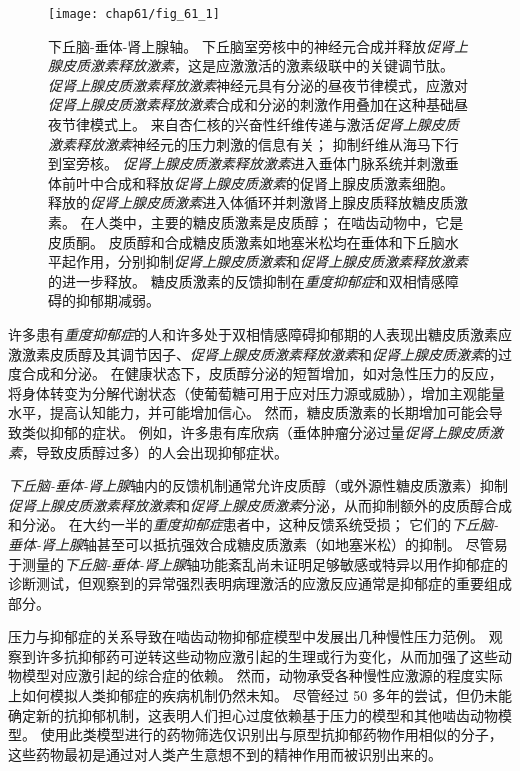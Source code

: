 \begin{figure}[htbp]
	\centering
	\texttt{[image: chap61/fig\_61\_1]}
	\caption{下丘脑-垂体-肾上腺轴。
		下丘脑室旁核中的神经元合成并释放\textit{促肾上腺皮质激素释放激素}，这是应激激活的激素级联中的关键调节肽。
		\textit{促肾上腺皮质激素释放激素}神经元具有分泌的昼夜节律模式，应激对\textit{促肾上腺皮质激素释放激素}合成和分泌的刺激作用叠加在这种基础昼夜节律模式上。
		来自杏仁核的兴奋性纤维传递与激活\textit{促肾上腺皮质激素释放激素}神经元的压力刺激的信息有关；
		抑制纤维从海马下行到室旁核。
		\textit{促肾上腺皮质激素释放激素}进入垂体门脉系统并刺激垂体前叶中合成和释放\textit{促肾上腺皮质激素}的促肾上腺皮质激素细胞。
		释放的\textit{促肾上腺皮质激素}进入体循环并刺激肾上腺皮质释放糖皮质激素。
		在人类中，主要的糖皮质激素是皮质醇；
		在啮齿动物中，它是皮质酮。
		皮质醇和合成糖皮质激素如地塞米松均在垂体和下丘脑水平起作用，分别抑制\textit{促肾上腺皮质激素}和\textit{促肾上腺皮质激素释放激素}的进一步释放。
		糖皮质激素的反馈抑制在\textit{重度抑郁症}和双相情感障碍的抑郁期减弱\cite{nestler2020nestler}。}
	\label{fig:61_1}
\end{figure}


许多患有\textit{重度抑郁症}的人和许多处于双相情感障碍抑郁期的人表现出糖皮质激素应激激素皮质醇及其调节因子、\textit{促肾上腺皮质激素释放激素}和\textit{促肾上腺皮质激素}的过度合成和分泌。
在健康状态下，皮质醇分泌的短暂增加，如对急性压力的反应，将身体转变为分解代谢状态（使葡萄糖可用于应对压力源或威胁），增加主观能量水平，提高认知能力，并可能增加信心。
然而，糖皮质激素的长期增加可能会导致类似抑郁的症状。
例如，许多患有库欣病（垂体肿瘤分泌过量\textit{促肾上腺皮质激素}，导致皮质醇过多）的人会出现抑郁症状。


\textit{下丘脑-垂体-肾上腺}轴内的反馈机制通常允许皮质醇（或外源性糖皮质激素）抑制\textit{促肾上腺皮质激素释放激素}和\textit{促肾上腺皮质激素}分泌，从而抑制额外的皮质醇合成和分泌。
在大约一半的\textit{重度抑郁症}患者中，这种反馈系统受损；
它们的\textit{下丘脑-垂体-肾上腺}轴甚至可以抵抗强效合成糖皮质激素（如地塞米松）的抑制。
尽管易于测量的\textit{下丘脑-垂体-肾上腺}轴功能紊乱尚未证明足够敏感或特异以用作抑郁症的诊断测试，但观察到的异常强烈表明病理激活的应激反应通常是抑郁症的重要组成部分。


压力与抑郁症的关系导致在啮齿动物抑郁症模型中发展出几种慢性压力范例。
观察到许多抗抑郁药可逆转这些动物应激引起的生理或行为变化，从而加强了这些动物模型对应激引起的综合症的依赖。
然而，动物承受各种慢性应激源的程度实际上如何模拟人类抑郁症的疾病机制仍然未知。
尽管经过 50 多年的尝试，但仍未能确定新的抗抑郁机制，这表明人们担心过度依赖基于压力的模型和其他啮齿动物模型。
使用此类模型进行的药物筛选仅识别出与原型抗抑郁药物作用相似的分子，这些药物最初是通过对人类产生意想不到的精神作用而被识别出来的。



